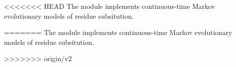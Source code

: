 <<<<<<< HEAD
The  module implements continuous-time Markov
evolutionary models of residue subsitution.

=======
The  module implements continuous-time Markov
evolutionary models of residue subsitution.

>>>>>>> origin/v2
